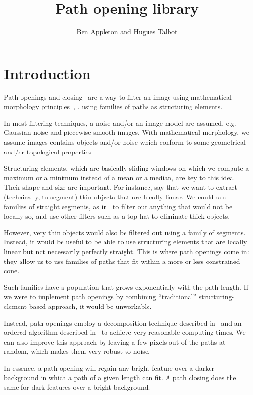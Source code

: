 \documentclass[11pt]{article}
\title{Path opening library}
\author{Ben Appleton and Hugues Talbot}
\begin{document}
\maketitle

\section{Introduction}
Path openings and closing~\cite{Talbot2007,Heijmans2005,Appleton2005,Heijmans2004,Buckley2000} are a way to filter an image using mathematical morphology principles~\cite{serra88,serra82}, \cite{pierres_book03},\cite{Najman2008b} using families of paths as structuring elements.

In most filtering techniques, a noise and/or an image model are assumed, e.g. Gaussian noise and piecewise smooth images. With mathematical morphology, we assume images contains objects and/or noise which conform to some geometrical and/or topological properties.

Structuring elements, which are basically sliding windows on which we compute a maximum or a minimum instead of a mean or a median, are key to this idea. Their shape and size are important. For instance, say that we want to extract (technically, to segment) thin objects that are locally linear. We could use families of straight segments, as in~\cite{Soille2001} to filter out anything that would not be locally so, and use other filters such as a top-hat to eliminate thick objects.

However, very thin objects would also be filtered out using a family of segments. Instead, it would be useful to be able to use structuring elements that are locally linear but not necessarily perfectly straight. This is where path openings come in: they allow us to use families of paths that fit within a more or less constrained cone. 

Such families have a population that grows exponentially with the path length. If we were to implement path openings by combining ``traditional'' structuring-element-based approach, it would be unworkable. 

Instead, path openings employ a decomposition technique described in~\cite{Heijmans2005} and an ordered algorithm described in~\cite{Talbot2007} to achieve very reasonable computing times. We can also improve this approach by leaving a few pixels out of the paths at random, which makes them very robust to noise.

In essence, a path opening will regain any bright feature over a darker background in which a path of a given length can fit. A path closing does the same for dark features over a bright background.
\end{document}
